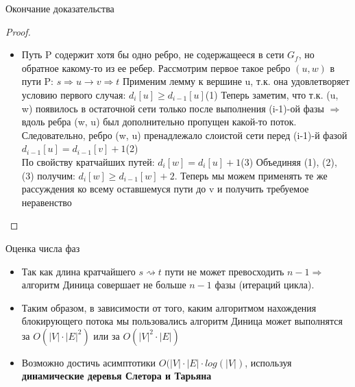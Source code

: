 \documentclass{beamer}
\begin{document}
\begin{frame}{Окончание доказательства}
    \begin{proof}
    \begin{itemize}
        \item Путь P содержит хотя бы одно ребро, не содержащееся в сети $G_{f}$, но обратное какому-то из ее ребер. Рассмотрим первое такое ребро $(u, w)$ в пути P:
        $s \Longrightarrow u \rightarrow v \Longrightarrow t$
        Применим лемму к вершине u, т.к. она удовлетворяет условию первого случая: $d_{i}[u] \geq d_{i-1}[u]$(1)
        \pause
        Теперь заметим, что т.к. (u, w) появилось в остаточной сети только после выполнения (i-1)-ой фазы $\Rightarrow$ вдоль ребра (w, u) был дополнительно пропущен какой-то поток. Следовательно, ребро (w, u) пренадлежало слоистой сети перед (i-1)-й фазой \Rightarrow $d_{i-1}[u] = d_{i-1}[v] + 1$(2) \\
        По свойству кратчайших путей: $d_{i}[w] = d_{i}[u] + 1$(3)
        Объединяя (1), (2), (3) получим: $d_{i}[w] \geq d_{i-1}[w] + 2$. Теперь мы можем применять те же рассуждения ко всему оставшемуся пути до v и получить требуемое неравенство
    \end{itemize}
    \end{proof}
\end{frame}

\begin{frame}{Оценка числа фаз}
    \begin{itemize}
    \item {
        Так как длина кратчайшего $s \rightsquigarrow t$ пути не может превосходить $n - 1 \Rightarrow$ алгоритм Диница совершает не больше $n - 1$ фазы (итераций цикла).
        \pause
    }
    \item {
        Таким образом, в зависимости от того, каким алгоритмом нахождения блокирующего потока мы пользовались алгоритм Диница может выполнятся за $O(|V| \cdot |E|^{2})$ или за $O(|V|^{2} \cdot |E|)$\\
        \pause
    }
    \item {
        Возможно достичь асимптотики $O(|V| \cdot |E| \cdot log(|V|)$, используя \textbf{динамические деревья Слетора и Тарьяна}
    }

    \end{itemize}
\end{frame}
\end{document}
